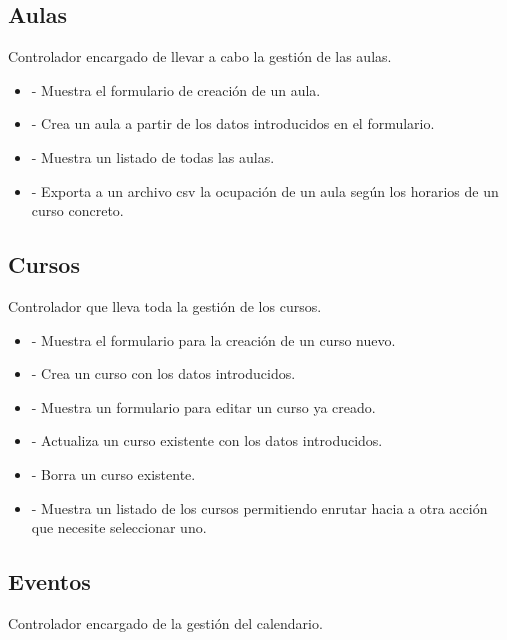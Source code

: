 \subsection{Aulas}
Controlador encargado de llevar a cabo la gestión de las aulas.

\begin{itemize}
\item {} - Muestra el formulario de creación de un aula.
\item {} - Crea un aula a partir de los datos introducidos en el formulario.
\item {} - Muestra un listado de todas las aulas.
\item {} - Exporta a un archivo csv la ocupación de un aula según los horarios de un curso concreto.
\end{itemize}

\subsection{Cursos}

Controlador que lleva toda la gestión de los cursos.

\begin{itemize}
\item {} - Muestra el formulario para la creación de un curso nuevo.
\item {} - Crea un curso con los datos introducidos.
\item {} - Muestra un formulario para editar un curso ya creado.
\item {} - Actualiza un curso existente con los datos introducidos.
\item {} - Borra un curso existente.
\item {} - Muestra un listado de los cursos permitiendo enrutar hacia a otra acción que necesite seleccionar uno.
\end{itemize}

\subsection{Eventos}

Controlador encargado de la gestión del calendario.

